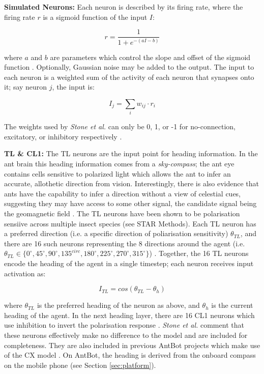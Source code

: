 \documentclass[a4paper,11pt,twoside,openright]{article}
\begin{document}
\textbf{Simulated Neurons:}
Each neuron is described by its firing rate, where the firing rate $r$ is
a sigmoid function of the input $I$:

\begin{equation}
r = \frac{1}{1 + e^{-(aI - b)}}
\end{equation}

where $a$ and $b$ are parameters which control the slope and offset of the
sigmoid function \cite{Stone2017}. Optionally, Gaussian noise may be added
to the output. The input to each neuron is a weighted sum of the activity
of each neuron that synapses onto it; say neuron $j$, the input is:

\begin{equation}
  I_j = \sum_{i} w_{ij} \cdot r_i
\end{equation}

The weights used by \textit{Stone et al.} can only be 0, 1, or -1 for
no-connection, excitatory, or inhibitory respectively \cite{Stone2017}.

\textbf{TL \& CL1:}
The TL neurons are the input point for heading information. In the ant brain
this heading information comes from a \textit{sky-compass}; the ant eye contains
cells sensitive to polarized light which allows the ant to infer an accurate,
allothetic direction from vision. Interestingly, there is also evidence that ants
have the capability to infer a direction without a view of celestial cues,
suggesting they may have access to some other signal, the candidate signal being
the geomagnetic field \cite{Fleischmann2018, Grob2017}. The TL neurons have been
shown to be polarisation sensiive across multiple insect species \cite{Stone2017}
(see STAR Methods). Each TL neuron has a preferred direction (i.e. a specific
direction of poliarisation sensitivity) $\theta_{TL} $, and there are 16 such
neurons representing the 8 directions around the agent (i.e.
$\theta_{TL} \in \{ 0^{\circ}, 45^{\circ}, 90^{\circ}, 135^{circ}, 180^{\circ},
225^{\circ}, 270^{\circ}, 315^{\circ}\} $) \cite{Stone2017}. Together, the 16
TL neurons encode the heading of the agent in a single timestep; each neuron
receives input activation as:

\begin{equation}
  I_{TL} = cos( \theta_{TL} - \theta_{h} )
\end{equation}

where $\theta_{TL} $ is the preferred heading of the neuron as above, and
$\theta_{h} $ is the current heading of the agent. In the next heading layer,
there are 16 CL1 neurons which use inhibition to invert the polarisation
response \cite{Stone2017}. \textit{Stone et al.} comment that these neurons
effectively make no difference to the model and are included for completeness.
They are also included in previous AntBot projects which make use of the CX model
\cite{Zhang2017, Scimeca2017}. On AntBot, the heading is derived from the onboard
compass on the mobile phone (see Section \ref{sec:platform}).
\newline
\par
\end{document}
